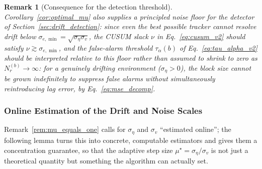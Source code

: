 ﻿\documentclass[12pt,a4paper]{article}
\newtheorem{remark}{Remark}
\begin{document}
\begin{remark}[Consequence for the detection threshold]
	\label{rem:noise_floor}
	Corollary~\ref{cor:optimal_mu} also supplies a principled \emph{noise
	floor} for the detector of Section~\ref{sec:drift_detection}: since even
	the best possible tracker cannot resolve drift below
	$\sigma_{e,\min}=\sqrt{\sigma_\eta\sigma_v}$, the CUSUM slack $\nu$ in
	Eq.~\eqref{eq:cusum_v2} should satisfy $\nu \gtrsim \sigma_{e,\min}$, and
	the false-alarm threshold $\tau_\alpha(b)$ of Eq.~\eqref{eq:tau_alpha_v2}
	should be interpreted relative to this floor rather than assumed to
	shrink to zero as $N_r^{(b)}\to\infty$: for a genuinely drifting
	environment ($\sigma_\eta>0$), the block size cannot be grown
	indefinitely to suppress false alarms without simultaneously
	reintroducing lag error, by Eq.~\eqref{eq:mse_decomp}.
\end{remark}

\subsubsection{Online Estimation of the Drift and Noise Scales}
\label{sec:online_scales}

Remark~\ref{rem:mu_equals_one} calls for $\sigma_\eta$ and $\sigma_v$
``estimated online''; the following lemma turns this into concrete,
computable estimators and gives them a concentration guarantee, so that the
adaptive step size $\mu^\star=\sigma_\eta/\sigma_v$ is not just a
theoretical quantity but something the algorithm can actually set.
\end{document}
